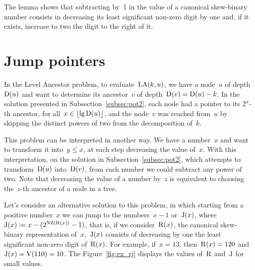 \documentclass[main.tex]{subfiles}
\begin{document}
The lemma shows that subtracting by~1 in the value of a canonical skew-binary number consists in decreasing its least significant non-zero digit by one and, if it exists, increase to two the digit to the right of it.

\section{Jump pointers}

In the Level Ancestor problem, to evaluate~$\operatorname{LA}(k, u)$, we have a node~$u$ of depth~$\operatorname{D}(u)$ and want to determine its ancestor~$v$ of depth~${\operatorname{D}(v) = \operatorname{D}(u) - k}$. In the solution presented in Subsection~\ref{subsec:pot2}, each node had a pointer to its $2^x$-th ancestor, for all~${x \in \lfloor\lg\operatorname{D}(u)\rfloor}$, and the node~$v$ was reached from~$u$ by skipping the distinct powers of two from the decomposition of~$k$.

This problem can be interpreted in another way. We have a number~$x$ and want to transform it into~$y \leq x$, at each step decreasing the value of~$x$. With this interpretation, on the solution in Subsection~\ref{subsec:pot2}, which attempts to transform~$\operatorname{D}(u)$ into~$\operatorname{D}(v)$, from each number we could subtract any power of two. Note that decreasing the value of a number by~$z$ is equivalent to choosing the~$z$-th ancestor of a node in a tree.

Let's consider an alternative solution to this problem, in which starting from a positive number~$x$ we can jump to the numbers~$x-1$ or~$\operatorname{J}(x)$, where~${\operatorname{J}(x) \coloneqq x - (2^{\operatorname{NZ}(\operatorname{R}(x))} - 1)}$, that is, if we consider~$\operatorname{R}(x)$, the canonical skew-binary representation of~$x$,~$\operatorname{J}(x)$ consists of decreasing by one the least significant non-zero digit of~$\operatorname{R}(x)$. For example, if~$x = 13$, then~${\operatorname{R}(x) = 120}$ and~${\operatorname{J}(x) = \operatorname{V}(110) = 10}$. The Figure~\ref{fig:ex_rj} displays the values of~$\operatorname{R}$ and~$\operatorname{J}$ for small values.
\end{document}
